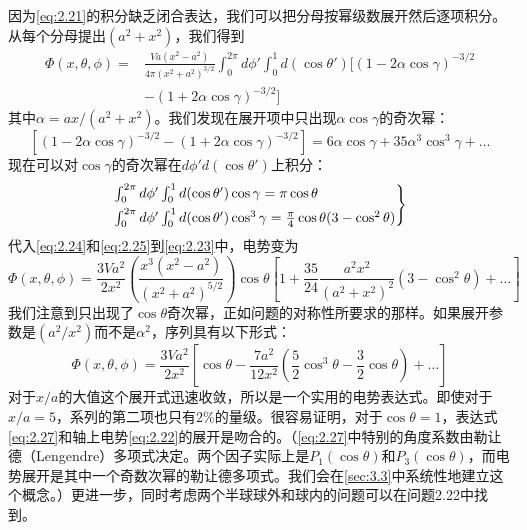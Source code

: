 \documentclass[12pt]{book}
\numberwithin{equation}{chapter}
\numberwithin{figure}{chapter}
\numberwithin{footnote}{page}
\begin{document}
因为\autoref{eq:2.21}的积分缺乏闭合表达，我们可以把分母按幂级数展开然后逐项积分。从每个分母提出$(a^2+x^2)$，我们得到
\begin{equation}\label{eq:2.23}
    \begin{aligned}
        \Phi(x,\theta,\phi)=&\frac{Va(x^2-a^2)}{4\pi(x^2+a^2)^{3/2}}\int_0^{2\pi}d\phi' \int_0^1 d(\cos\theta')[(1-2\alpha\cos\gamma)^{-3/2}\\
        &-(1+2\alpha\cos\gamma)^{-3/2}]
    \end{aligned}
\end{equation}
其中$\alpha=ax/(a^2+x^2)$。我们发现在展开项中只出现$\alpha\cos\gamma$的奇次幂：
\begin{equation}\label{eq:2.24}
    [(1-2\alpha\cos\gamma)^{-3/2}-(1+2\alpha\cos\gamma)^{-3/2}]=6\alpha\cos\gamma+35\alpha^3\cos^3\gamma+\dots
\end{equation}
现在可以对$\cos\gamma$的奇次幂在$d\phi' d(\cos\theta')$上积分：
\begin{equation}\label{eq:2.25}
    \begin{rcases*}
    \int_0^{2\pi}d\phi'\int_0^1 d(\cos\theta')\cos\gamma=\pi\cos\theta\\
    \int_0^{2\pi}d\phi'\int_0^1 d(\cos\theta')\cos^3\gamma=\frac{\pi}{4}\cos\theta(3-\cos^2\theta)\\
    \end{rcases*}
\end{equation}
代入\autoref{eq:2.24}和\autoref{eq:2.25}到\autoref{eq:2.23}中，电势变为
\begin{equation}\label{eq:2.26}
    \Phi(x,\theta,\phi)=\frac{3Va^2}{2x^2}(\frac{x^3(x^2-a^2)}{(x^2+a^2)^{5/2}})\cos\theta[1+\frac{35}{24}\frac{a^2x^2}{(a^2+x^2)^2}(3-\cos^2\theta)+\dots]
\end{equation}
我们注意到只出现了$\cos\theta$奇次幂，正如问题的对称性所要求的那样。如果展开参数是$(a^2/x^2)$而不是$\alpha^2$，序列具有以下形式：
\begin{equation}\label{eq:2.27}
    \Phi(x,\theta,\phi)=\frac{3Va^2}{2x^2}[\cos\theta-\frac{7a^2}{12x^2}(\frac{5}{2}\cos^3\theta-\frac{3}{2}\cos\theta)+\dots]
\end{equation}
对于$x/a$的大值这个展开式迅速收敛，所以是一个实用的电势表达式。即使对于$x/a=5$，系列的第二项也只有$2\%$的量级。很容易证明，对于$\cos\theta=1$，表达式\autoref{eq:2.27}和轴上电势\autoref{eq:2.22}的展开是吻合的。（\autoref{eq:2.27}中特别的角度系数由勒让德（Lengendre）多项式决定。两个因子实际上是$P_1(\cos\theta)$和$P_3(\cos\theta)$，而电势展开是其中一个奇数次幂的勒让德多项式。我们会在\autoref{sec:3.3}中系统性地建立这个概念。）更进一步，同时考虑两个半球球外和球内的问题可以在问题2.22中找到。
\end{document}
